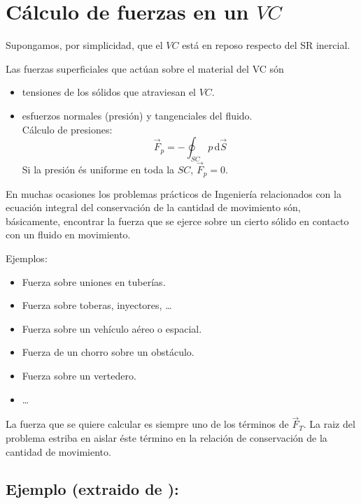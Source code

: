 \section{Cálculo de fuerzas en un $VC$}

	
	Supongamos, por simplicidad, que el $VC$ está en reposo respecto
	del SR inercial.
	
	Las fuerzas superficiales que actúan sobre el material del VC són 
	\begin{itemize}
		\item tensiones de los sólidos que atraviesan el $VC$. 
		\item esfuerzos normales (presión) y tangenciales del fluido.\\
		Cálculo de presiones: 
		\[
		\vec{F}_{p}=-\oint_{SC}p\,\text{d}\vec{S}
		\]
		Si la presión és uniforme en toda la $SC$, $\vec{F}_{p}=0$. 
	\end{itemize}

	
	En muchas ocasiones los problemas prácticos de Ingeniería relacionados
	con la ecuación integral del conservación de la cantidad de movimiento
	són, básicamente, encontrar la fuerza que se ejerce sobre un cierto
	sólido en contacto con un fluido en movimiento.
	
	Ejemplos: 
	\begin{itemize}
		\item Fuerza sobre uniones en tuberías. 
		\item Fuerza sobre toberas, inyectores, \ldots{} 
		\item Fuerza sobre un vehículo aéreo o espacial. 
		\item Fuerza de un chorro sobre un obstáculo. 
		\item Fuerza sobre un vertedero. 
		\item \ldots{} 
	\end{itemize}
	La fuerza que se quiere calcular es siempre uno de los términos de
	$\vec{F}_{T}$. La raiz del problema estriba en aislar éste término
	en la relación de conservación de la cantidad de movimiento.

	
	\subsection*{Ejemplo (extraido de \cite{White2008}):}
		
